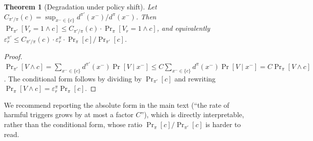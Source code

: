 \documentclass[11pt]{article}
\theoremstyle{plain}
\newtheorem{theorem}{Theorem}[section]
\theoremstyle{definition}
\theoremstyle{remark}
\begin{document}
\begin{theorem}[Degradation under policy shift]
\label{thm:t4-full}
Let $C_{\pi'/\pi}(c)=\sup_{x^-\in\{c\}}d^{\pi'}(x^-)/d^\pi(x^-)$. Then $\Pr_{\pi'}[V_r=1\wedge c]\le C_{\pi'/\pi}(c)\cdot\Pr_\pi[V_r=1\wedge c]$, and equivalently $\varepsilon^{\pi'}_r\le C_{\pi'/\pi}(c)\cdot\varepsilon^\pi_r\cdot\Pr_\pi[c]/\Pr_{\pi'}[c]$.
\end{theorem}
\begin{proof}
$\Pr_{\pi'}[V\wedge c]=\sum_{x^-\in\{c\}}d^{\pi'}(x^-)\Pr[V\mid x^-]\le C\sum_{x^-\in\{c\}}d^\pi(x^-)\Pr[V\mid x^-]=C\Pr_\pi[V\wedge c]$. The conditional form follows by dividing by $\Pr_{\pi'}[c]$ and rewriting $\Pr_\pi[V\wedge c]=\varepsilon^\pi_r\Pr_\pi[c]$.
\end{proof}
We recommend reporting the absolute form in the main text (``the rate of harmful triggers grows by at most a factor $C$''), which is directly interpretable, rather than the conditional form, whose ratio $\Pr_\pi[c]/\Pr_{\pi'}[c]$ is harder to read.
\end{document}
